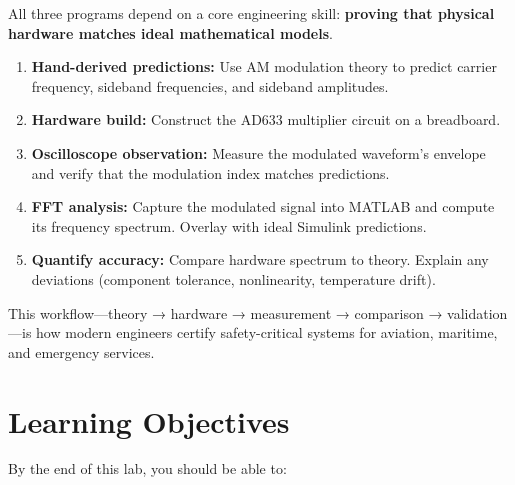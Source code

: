 \documentclass[11pt,letterpaper]{article}
\begin{document}
All three programs depend on a core engineering skill: \textbf{proving that physical hardware matches ideal mathematical models}.

\begin{enumerate}
    \item \textbf{Hand-derived predictions:} Use AM modulation theory to predict carrier frequency, sideband frequencies, and sideband amplitudes.
    \item \textbf{Hardware build:} Construct the AD633 multiplier circuit on a breadboard.
    \item \textbf{Oscilloscope observation:} Measure the modulated waveform's envelope and verify that the modulation index matches predictions.
    \item \textbf{FFT analysis:} Capture the modulated signal into MATLAB and compute its frequency spectrum. Overlay with ideal Simulink predictions.
    \item \textbf{Quantify accuracy:} Compare hardware spectrum to theory. Explain any deviations (component tolerance, nonlinearity, temperature drift).
\end{enumerate}

This workflow—theory → hardware → measurement → comparison → validation—is how modern engineers certify safety-critical systems for aviation, maritime, and emergency services.

\clearpage

\section{Learning Objectives}

By the end of this lab, you should be able to:
\end{document}
